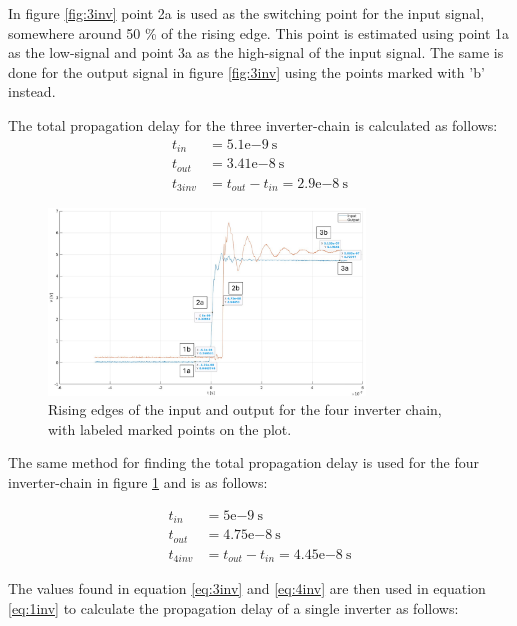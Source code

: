 \documentclass[onecolumn]{article}
\begin{document}
In figure \ref{fig:3inv} point 2a is used as the switching point for the input signal, somewhere around 50 \% of the rising edge. This point is estimated using point 1a as the low-signal and point 3a as the high-signal of the input signal. The same is done for the output signal in figure \ref{fig:3inv} using the points marked with 'b' instead.

The total propagation delay for the three inverter-chain is calculated as follows:
\begin{align}
    t_{in} &= 5.1\mathrm{e}{-9} \ \text{s} \\
    t_{out} &= 3.41\mathrm{e}{-8} \ \text{s} \\
    t_{3inv} &= t_{out} - t_{in} = 2.9\mathrm{e}{-8} \ \text{s} \label{eq:3inv}
\end{align}

\begin{figure}[h!]
    \centering
    \includegraphics[width=0.75\textwidth]{4_inverters_marked.png}
    \caption{Rising edges of the input and output for the four inverter chain, with labeled marked points on the plot.}
    \label{fig:4inv}
\end{figure}

The same method for finding the total propagation delay is used for the four inverter-chain in figure \ref{fig:4inv} and is as follows:

\begin{align}
    t_{in} &= 5\mathrm{e}{-9} \ \text{s} \\
    t_{out} &= 4.75\mathrm{e}{-8} \ \text{s} \\
    t_{4inv} &= t_{out} - t_{in} = 4.45\mathrm{e}{-8} \  \text{s} \label{eq:4inv}
\end{align}

The values found in equation \ref{eq:3inv} and \ref{eq:4inv} are then used in equation \ref{eq:1inv} to calculate the propagation delay of a single inverter as follows:
\end{document}

